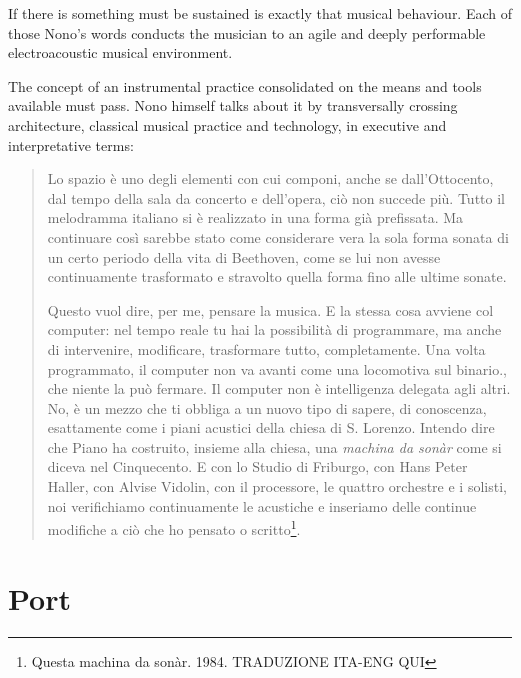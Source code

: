 \documentclass[twoside,a4paper]{article}
\begin{document}
If there is something must be sustained is exactly that musical behaviour. Each of those Nono's words conducts the musician to an agile and deeply performable electroacoustic musical environment. 

The concept of an instrumental practice consolidated on the means and tools available must pass. Nono himself talks about it by transversally crossing architecture, classical musical practice and technology, in executive and interpretative terms:

\begin{quote}
Lo spazio è uno degli elementi con cui componi, anche se dall'Ottocento, dal tempo della sala da concerto e dell'opera, ciò non succede più. 
Tutto il melodramma italiano si è realizzato in una forma già prefissata. Ma continuare così sarebbe stato come considerare vera la sola forma sonata di un certo periodo della vita di Beethoven, come se lui non avesse continuamente trasformato e stravolto quella forma fino alle ultime sonate. 

Questo vuol dire, per me, pensare la musica. E la stessa cosa avviene col computer: nel tempo reale tu hai la possibilità di programmare, ma anche di intervenire, modificare, trasformare tutto, completamente. Una volta programmato, il computer non va avanti come una locomotiva sul binario., che niente la può fermare. Il computer non è intelligenza delegata agli altri. No, è un mezzo che ti obbliga a un nuovo tipo di sapere, di conoscenza, esattamente come i piani acustici della chiesa di S. Lorenzo. Intendo dire che Piano ha costruito, insieme alla chiesa, una \emph{machina da sonàr} come si diceva nel Cinquecento. E con lo Studio di Friburgo, con Hans Peter Haller, con Alvise Vidolin, con il processore, le quattro orchestre e i solisti, noi verifichiamo continuamente le acustiche e inseriamo delle continue modifiche a ciò che ho pensato o scritto\footnote{Questa machina da sonàr. 1984. TRADUZIONE ITA-ENG QUI}. 
\end{quote}


\section{Port}
\label{sec:porting}
\end{document}

